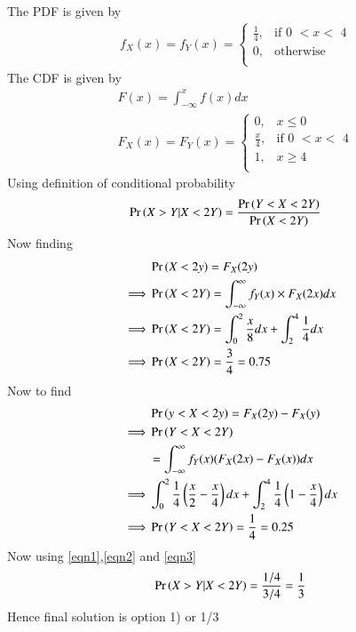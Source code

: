 
The PDF is given by
\begin{align}
   &f_X (x)=f_Y (x)=\nonumber \begin{cases}
         \frac{1}{4}, &\text{if 0 \(< x <\) 4}\\
         0, &\text{otherwise}\\
   \end{cases} 
\end{align}    
The CDF is given by
\begin{align}
   \nonumber& F(x)=\int_{-\infty}^{x} f(x)dx \\ \nonumber
   &F_X (x)=F_Y (x)=\nonumber \begin{cases}
          0, & x\leq 0\\
         \frac{x}{4}, &\text{if 0 \(< x <\) 4}\\
          1, &x\geq4\\
   \end{cases}    
\end{align}
Using definition of conditional probability 
\begin{align}
    &\Pr\left(X>Y|X<2Y\right)=\frac{\Pr\left(Y < X< 2Y\right)}{\Pr\left(X<2Y\right)} \label{eqn1}
\end{align}
Now finding 
\begin{align}
    &\Pr\left(X<2y\right)=F_X (2y)\\
    \implies& \Pr\left(X<2Y\right)=\int_{-\infty}^{\infty} f_Y(x) \times F_X (2x)dx\\
    \implies& \Pr\left(X<2Y\right)=\int_{0}^{2} \frac{x}{8}dx +\int_{2}^{4}\frac{1}{4}dx\\
    \implies& \Pr\left(X<2Y\right)=\frac{3}{4}=0.75 \label{eqn2}
\end{align}
Now to find 
\begin{align}
    &\Pr\left(y<X<2y\right)=F_X (2y)- F_X (y) \\
    \implies &\Pr\left(Y<X<2Y\right)\\ \nonumber 
    &=\int_{-\infty}^{\infty} f_Y (x)( F_X (2x)- F_X(x))dx \\
   \implies &\int_{0}^{2}\frac{1}{4}\left(\frac{x}{2}-\frac{x}{4}\right) dx +\int_{2}^{4}\frac{1}{4}\left(1-\frac{x}{4}\right) dx\\
   \implies &\Pr\left(Y<X<2Y\right)=\frac{1}{4}=0.25 \label{eqn3}
\end{align}
Now using \eqref{eqn1},\eqref{eqn2} and \eqref{eqn3}
\begin{align}
    \Pr\left(X>Y|X<2Y\right)=\frac{1/4}{3/4}=\frac{1}{3}
\end{align}
Hence final solution is option 1) or 1/3 